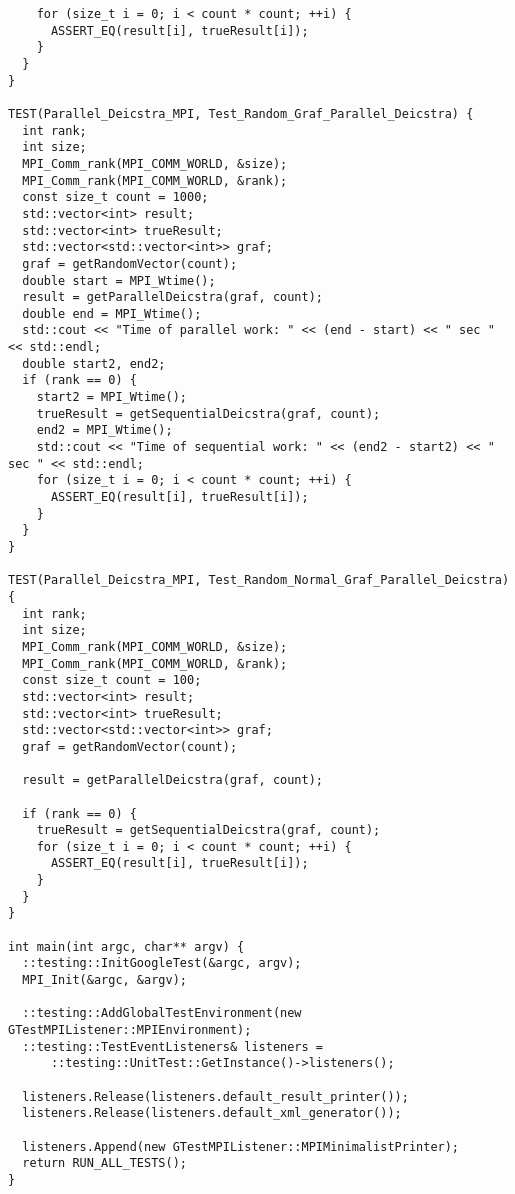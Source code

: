 \documentclass{report}
\begin{document}
\begin{lstlisting}
    for (size_t i = 0; i < count * count; ++i) {
      ASSERT_EQ(result[i], trueResult[i]);
    }
  }
}

TEST(Parallel_Deicstra_MPI, Test_Random_Graf_Parallel_Deicstra) {
  int rank;
  int size;
  MPI_Comm_rank(MPI_COMM_WORLD, &size);
  MPI_Comm_rank(MPI_COMM_WORLD, &rank);
  const size_t count = 1000;
  std::vector<int> result;
  std::vector<int> trueResult;
  std::vector<std::vector<int>> graf;
  graf = getRandomVector(count);
  double start = MPI_Wtime();
  result = getParallelDeicstra(graf, count);
  double end = MPI_Wtime();
  std::cout << "Time of parallel work: " << (end - start) << " sec " << std::endl;
  double start2, end2;
  if (rank == 0) {
    start2 = MPI_Wtime();
    trueResult = getSequentialDeicstra(graf, count);
    end2 = MPI_Wtime();
    std::cout << "Time of sequential work: " << (end2 - start2) << " sec " << std::endl;
    for (size_t i = 0; i < count * count; ++i) {
      ASSERT_EQ(result[i], trueResult[i]);
    }
  }
}

TEST(Parallel_Deicstra_MPI, Test_Random_Normal_Graf_Parallel_Deicstra) {
  int rank;
  int size;
  MPI_Comm_rank(MPI_COMM_WORLD, &size);
  MPI_Comm_rank(MPI_COMM_WORLD, &rank);
  const size_t count = 100;
  std::vector<int> result;
  std::vector<int> trueResult;
  std::vector<std::vector<int>> graf;
  graf = getRandomVector(count);

  result = getParallelDeicstra(graf, count);

  if (rank == 0) {
    trueResult = getSequentialDeicstra(graf, count);
    for (size_t i = 0; i < count * count; ++i) {
      ASSERT_EQ(result[i], trueResult[i]);
    }
  }
}

int main(int argc, char** argv) {
  ::testing::InitGoogleTest(&argc, argv);
  MPI_Init(&argc, &argv);

  ::testing::AddGlobalTestEnvironment(new GTestMPIListener::MPIEnvironment);
  ::testing::TestEventListeners& listeners =
      ::testing::UnitTest::GetInstance()->listeners();

  listeners.Release(listeners.default_result_printer());
  listeners.Release(listeners.default_xml_generator());

  listeners.Append(new GTestMPIListener::MPIMinimalistPrinter);
  return RUN_ALL_TESTS();
}

\end{lstlisting}
\end{document}
